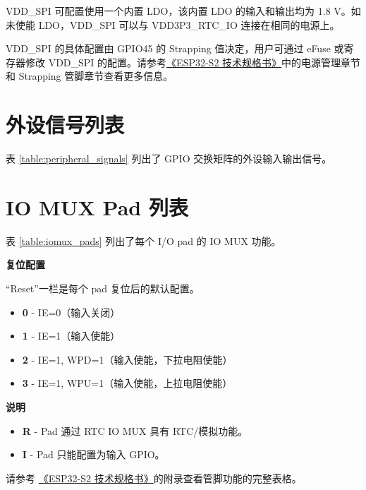 \documentclass[main\_\_CN.tex]{subfiles}
\begin{document}
VDD\_SPI 可配置使用一个内置 LDO，该内置 LDO 的输入和输出均为 1.8 V。如未使能 LDO，VDD\_SPI 可以与 VDD3P3\_RTC\_IO 连接在相同的电源上。

VDD\_SPI 的具体配置由 GPIO45 的 Strapping 值决定，用户可通过 eFuse 或寄存器修改 VDD\_SPI 的配置。请参考\href{https://www.espressif.com/sites/default/files/documentation/esp32-s2_datasheet_cn.pdf}{《ESP32-S2 技术规格书》}中的电源管理章节和 Strapping 管脚章节查看更多信息。



\section{外设信号列表}
\label{sec:peripheral_signals}

表 \ref{table:peripheral_signals} 列出了 GPIO 交换矩阵的外设输入输出信号。

 

\section{IO MUX Pad 列表}
\label{sec:iomux_pads}
表 \ref{table:iomux_pads} 列出了每个 I/O pad 的 IO MUX 功能。

 

\textbf{复位配置}

“Reset”一栏是每个 pad 复位后的默认配置。

\begin{itemize}
\item \textbf{0} - IE=0（输入关闭）
\item \textbf{1} - IE=1（输入使能）
\item \textbf{2} - IE=1, WPD=1（输入使能，下拉电阻使能）
\item \textbf{3} - IE=1, WPU=1（输入使能，上拉电阻使能）
\end{itemize}

\textbf{说明}

\begin{itemize}
\item \textbf{R} - Pad 通过 RTC IO MUX 具有 RTC/模拟功能。
\item \textbf{I} - Pad 只能配置为输入 GPIO。
\end{itemize}

请参考 \href{https://www.espressif.com/sites/default/files/documentation/esp32-s2_datasheet_cn.pdf}{《ESP32-S2 技术规格书》}的附录查看管脚功能的完整表格。
\end{document}
